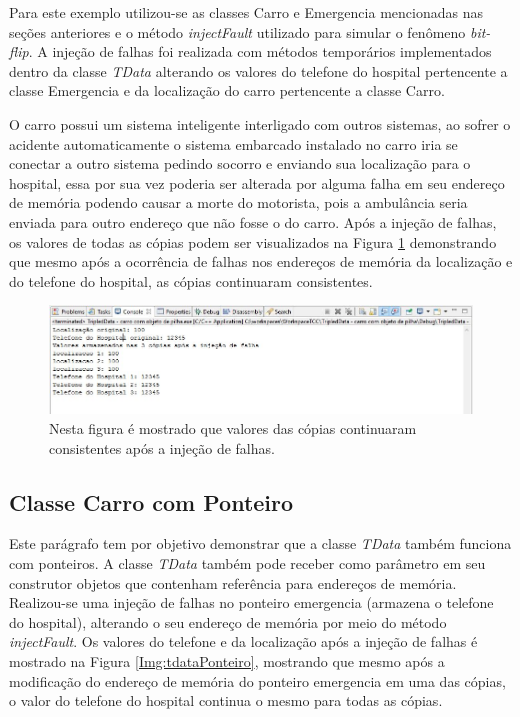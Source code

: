 Para este exemplo utilizou-se as classes Carro e Emergencia mencionadas nas seções anteriores e o método \textit{injectFault} utilizado para simular o fenômeno \textit{bit-flip}. A injeção de falhas foi realizada com métodos temporários implementados dentro da classe \textit{TData} alterando os valores do telefone do hospital pertencente a classe Emergencia e da localização do carro pertencente a classe Carro.

O carro possui um sistema inteligente interligado com outros sistemas, ao sofrer o acidente automaticamente o sistema embarcado instalado no carro iria se conectar a outro sistema pedindo socorro e enviando sua localização para o hospital, essa por sua vez poderia ser alterada por alguma falha em seu endereço de memória podendo causar a morte do motorista, pois a ambulância seria enviada para outro endereço que não fosse o do carro. Após a injeção de falhas, os valores  de todas as cópias podem ser visualizados na Figura \ref{Img:tdataObjetoPilha} demonstrando que mesmo após a ocorrência de falhas nos endereços de memória da localização e do telefone do hospital, as cópias continuaram consistentes.

\begin{figure}[H]
	\centering
	\includegraphics[width=1.0\textwidth]{figuras/tdataObjetoPilha.jpg}
	\caption[Valores das cópias consistentes após a injeção de falhas com objeto de pilha.]{Nesta figura é mostrado que valores das cópias continuaram consistentes após a injeção de falhas.}
	\label{Img:tdataObjetoPilha}	
\end{figure}

\subsection{Classe Carro com Ponteiro} \label{subsec:CarroPonteiro}

Este parágrafo tem por objetivo demonstrar que a classe \textit{TData} também funciona com ponteiros. A classe \textit{TData} também pode receber como parâmetro em seu construtor objetos que contenham referência para endereços de memória. Realizou-se uma injeção de falhas no ponteiro emergencia (armazena o telefone do hospital), alterando o seu endereço de memória por meio do método \textit{injectFault}. Os valores do telefone e da localização após a injeção de falhas é mostrado na Figura \ref{Img:tdataPonteiro}, mostrando que mesmo após a modificação do endereço de memória do ponteiro emergencia em uma das cópias, o valor do telefone do hospital continua o mesmo para todas as cópias.

